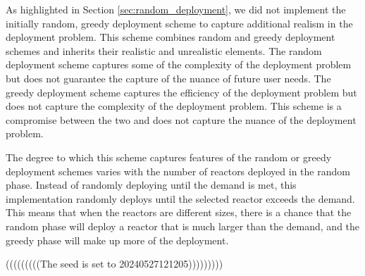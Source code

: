 As highlighted in Section \ref{sec:random_deployment}, we did not implement the
initially random, greedy deployment scheme to capture additional realism in the
deployment problem. This scheme combines random and greedy deployment schemes
and inherits their realistic and unrealistic elements. The random deployment
scheme captures some of the complexity of the deployment problem but does not
guarantee the capture of the nuance of future user needs. The greedy deployment
scheme captures the efficiency of the deployment problem but does not capture
the complexity of the deployment problem. This scheme is a compromise between
the two and does not capture the nuance of the deployment problem.

The degree to which this scheme captures features of the random or greedy
deployment schemes varies with the number of reactors deployed in the random
phase. Instead of randomly deploying until the demand is met, this
implementation randomly deploys until the selected reactor exceeds the demand.
This means that when the reactors are different sizes, there is a chance that
the random phase will deploy a reactor that is much larger than the demand, and
the greedy phase will make up more of the deployment.


(((((((((The seed is set to 20240527121205)))))))))